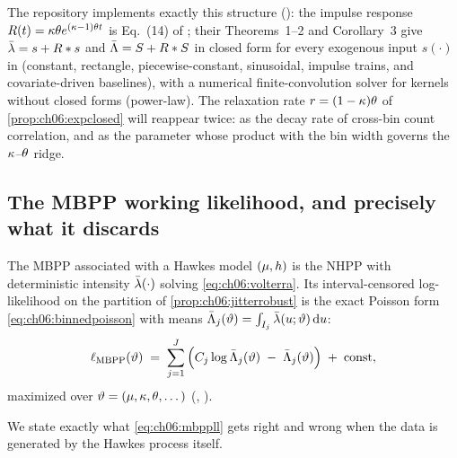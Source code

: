 The repository implements exactly this structure
(): the impulse response
$R(t) = \kappa\theta e^{(\kappa-1)\theta t}$ is Eq.~(14) of
\citet{rizoiu2022}; their Theorems~1--2 and Corollary~3 give
$\bar{\lambda} = s + R * s$ and $\bar{\Lambda} = S + R * S$ in closed form for every
exogenous input $s(\cdot)$ in  (constant,
rectangle, piecewise-constant, sinusoidal, impulse trains, and
covariate-driven baselines), with a numerical finite-convolution solver for
kernels without closed forms (power-law). The relaxation rate
$r = (1-\kappa)\theta$ of \cref{prop:ch06:expclosed} will reappear twice:
as the decay rate of cross-bin count correlation, and as the parameter
whose product with the bin width governs the $\kappa$--$\theta$ ridge.

\subsection{The MBPP working likelihood, and precisely what it discards}\label{ch06:sec:mbpplik}

\begin{definition}\label{def:ch06:mbpp}
The MBPP associated with a Hawkes model $(\mu,h)$ is the NHPP with
deterministic intensity $\bar{\lambda}(\cdot)$ solving
\cref{eq:ch06:volterra}. Its interval-censored log-likelihood on the
partition of \cref{prop:ch06:jitterrobust} is the exact Poisson form
\cref{eq:ch06:binnedpoisson} with means
$\bar{\Lambda}_j(\vartheta) = \int_{I_j}\bar{\lambda}(u;\vartheta)\,\mathrm{d} u$:
\begin{equation}\label{eq:ch06:mbppll}
\ell_{\mathrm{MBPP}}(\vartheta)
 \;=\;
 \sum_{j=1}^{J} \Big( C_j \log \bar{\Lambda}_j(\vartheta)
 \;-\; \bar{\Lambda}_j(\vartheta) \Big) \;+\; \text{const},
\end{equation}
maximized over $\vartheta = (\mu, \kappa, \theta, \dots)$
(, ).
\end{definition}

We state exactly what \cref{eq:ch06:mbppll} gets right and wrong when the
data is generated by the Hawkes process itself.

